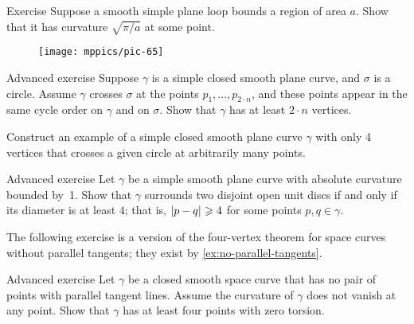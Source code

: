 \begin{thm}{Exercise}\label{ex:moon-area}
Suppose a smooth simple plane loop bounds a region of area $a$.
Show that it has curvature $\sqrt{\pi/a}$ at some point.
\end{thm}

\begin{wrapfigure}[5]{r}{25 mm}
\vskip-7mm
\centering
\texttt{[image: mppics/pic-65]}
\vskip0mm
\end{wrapfigure}

\begin{thm}{Advanced exercise}\label{ex:curve-crosses-circle}
Suppose $\gamma$ is a simple closed smooth plane curve, and $\sigma$ is a circle.
Assume $\gamma$ crosses $\sigma$ at the points $p_1,\dots,p_{2{\cdot} n}$, and these points appear in the same cycle order on $\gamma$ and on $\sigma$.
Show that $\gamma$ has at least $2\cdot n$ vertices.

Construct an example of a simple closed smooth plane curve $\gamma$ with only 4 vertices that crosses a given circle at arbitrarily many points. 
\end{thm}

\begin{thm}{Advanced exercise}\label{ex:berk}
Let $\gamma$ be a simple smooth plane curve with absolute curvature bounded by~1.
Show that $\gamma$ surrounds two disjoint open unit discs if and only if its diameter is at least $4$;
that is, $\dist{p}{q}{}\ge 4$ for some points $p,q\in\gamma$. 
\end{thm}


The following exercise is a version of the four-vertex theorem for space curves without parallel tangents; they exist by \ref{ex:no-parallel-tangents}.

\begin{thm}{Advanced exercise}\label{ex:4x0-torsion}
Let $\gamma$ be a closed smooth space curve that has no pair of points with parallel tangent lines.
Assume the curvature of $\gamma$ does not vanish at any point.
Show that $\gamma$ has at least four points with zero torsion.
\end{thm}
